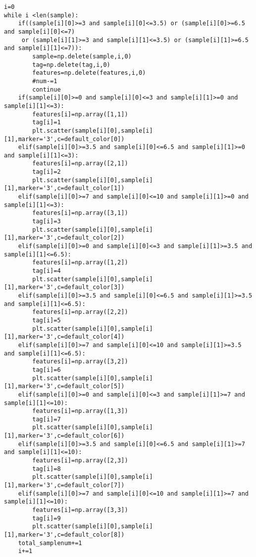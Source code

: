 \documentclass{article}
\begin{document}
\begin{verbatim}
i=0
while i <len(sample):
    if((sample[i][0]>=3 and sample[i][0]<=3.5) or (sample[i][0]>=6.5 and sample[i][0]<=7)
     or (sample[i][1]>=3 and sample[i][1]<=3.5) or (sample[i][1]>=6.5 and sample[i][1]<=7)):
        sample=np.delete(sample,i,0)
        tag=np.delete(tag,i,0)
        features=np.delete(features,i,0)
        #num-=1
        continue
    if(sample[i][0]>=0 and sample[i][0]<=3 and sample[i][1]>=0 and sample[i][1]<=3):
        features[i]=np.array([1,1])
        tag[i]=1
        plt.scatter(sample[i][0],sample[i][1],marker='3',c=default_color[0])
    elif(sample[i][0]>=3.5 and sample[i][0]<=6.5 and sample[i][1]>=0 and sample[i][1]<=3):
        features[i]=np.array([2,1])
        tag[i]=2
        plt.scatter(sample[i][0],sample[i][1],marker='3',c=default_color[1])
    elif(sample[i][0]>=7 and sample[i][0]<=10 and sample[i][1]>=0 and sample[i][1]<=3):
        features[i]=np.array([3,1])
        tag[i]=3
        plt.scatter(sample[i][0],sample[i][1],marker='3',c=default_color[2])
    elif(sample[i][0]>=0 and sample[i][0]<=3 and sample[i][1]>=3.5 and sample[i][1]<=6.5):
        features[i]=np.array([1,2])
        tag[i]=4
        plt.scatter(sample[i][0],sample[i][1],marker='3',c=default_color[3])
    elif(sample[i][0]>=3.5 and sample[i][0]<=6.5 and sample[i][1]>=3.5 and sample[i][1]<=6.5):
        features[i]=np.array([2,2])
        tag[i]=5
        plt.scatter(sample[i][0],sample[i][1],marker='3',c=default_color[4])
    elif(sample[i][0]>=7 and sample[i][0]<=10 and sample[i][1]>=3.5 and sample[i][1]<=6.5):
        features[i]=np.array([3,2])
        tag[i]=6
        plt.scatter(sample[i][0],sample[i][1],marker='3',c=default_color[5])
    elif(sample[i][0]>=0 and sample[i][0]<=3 and sample[i][1]>=7 and sample[i][1]<=10):
        features[i]=np.array([1,3])
        tag[i]=7
        plt.scatter(sample[i][0],sample[i][1],marker='3',c=default_color[6])
    elif(sample[i][0]>=3.5 and sample[i][0]<=6.5 and sample[i][1]>=7 and sample[i][1]<=10):
        features[i]=np.array([2,3])
        tag[i]=8
        plt.scatter(sample[i][0],sample[i][1],marker='3',c=default_color[7])
    elif(sample[i][0]>=7 and sample[i][0]<=10 and sample[i][1]>=7 and sample[i][1]<=10):
        features[i]=np.array([3,3])
        tag[i]=9
        plt.scatter(sample[i][0],sample[i][1],marker='3',c=default_color[8])
    total_samplenum+=1
    i+=1
    

\end{verbatim}
\end{document}
